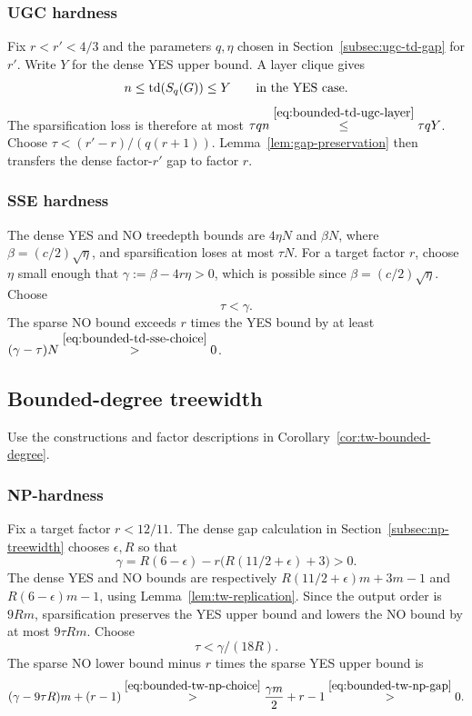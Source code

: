 \subsubsection{UGC hardness}
\label{app:transfer-td-ugc}
Fix $r<r'<4/3$ and the parameters $q,\eta$ chosen in
Section~\ref{subsec:ugc-td-gap} for $r'$. Write $Y$ for
the dense YES upper bound. A layer clique gives
\begin{equation}\label{eq:bounded-td-ugc-layer}
 n\le\operatorname{td}(S_q(G))\le Y\qquad\text{in the YES case}.
\end{equation}
The sparsification loss is therefore at most
$\tau qn\overset{\eqref{eq:bounded-td-ugc-layer}}{\le}\tau qY$.
Choose $\tau<(r'-r)/(q(r+1))$. Lemma~\ref{lem:gap-preservation}
then transfers the dense factor-$r'$ gap to factor $r$.

\subsubsection{SSE hardness}
\label{app:transfer-td-sse}
The dense YES and NO treedepth bounds are $4\eta N$ and $\beta N$,
where $\beta=(c/2)\sqrt\eta$, and sparsification loses at most $\tau N$.
For a target factor $r$, choose $\eta$
small enough that $\gamma:=\beta-4r\eta>0$, which is possible
since $\beta=(c/2)\sqrt{\eta}$. Choose
\begin{equation}\label{eq:bounded-td-sse-choice}
 \tau<\gamma.
\end{equation}
The sparse NO bound exceeds $r$ times the YES bound by at least
${(\gamma-\tau)N\overset{\eqref{eq:bounded-td-sse-choice}}{>}0}$.

\subsection{Bounded-degree treewidth}
\label{app:transfer-tw}
Use the constructions and factor descriptions in
Corollary~\ref{cor:tw-bounded-degree}.

\subsubsection{NP-hardness}
\label{app:transfer-tw-np}
Fix a target factor $r<12/11$. The dense gap calculation in
Section~\ref{subsec:np-treewidth} chooses $\epsilon,R$ so that
\begin{equation}\label{eq:bounded-tw-np-gap}
 \gamma=R(6-\epsilon)-r\bigl(R(11/2+\epsilon)+3\bigr)>0.
\end{equation}
The dense YES and NO bounds are respectively
$R(11/2+\epsilon)m+3m-1$ and $R(6-\epsilon)m-1$,
using Lemma~\ref{lem:tw-replication}.
Since the output order is $9Rm$, sparsification preserves the YES
upper bound and lowers the NO bound by at most $9\tau Rm$. Choose
\begin{equation}\label{eq:bounded-tw-np-choice}
 \tau<\gamma/(18R).
\end{equation}
The sparse NO lower bound minus $r$ times the
sparse YES upper bound is
\[
(\gamma-9\tau R)m+(r-1)
 \overset{\eqref{eq:bounded-tw-np-choice}}{>}
 \frac{\gamma m}{2}+r-1
 \overset{\eqref{eq:bounded-tw-np-gap}}{>}0.
\]

